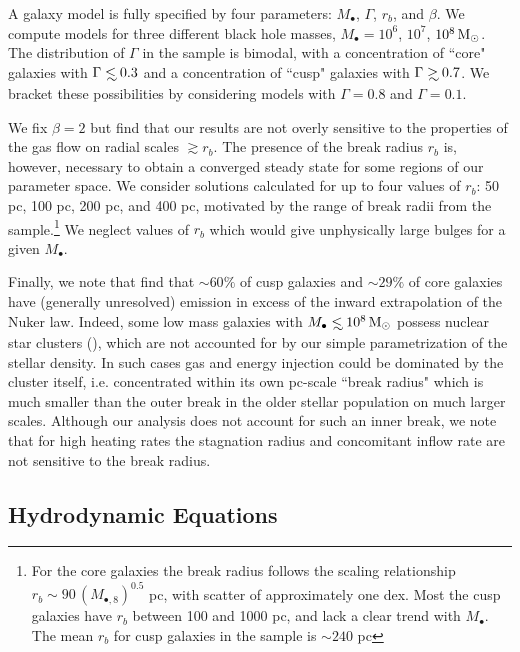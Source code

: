 \documentclass[usenatbib,fleqn]{mn2e}
\newcommand\lsim{\mathrel{\rlap{\lower4pt\hbox{\hskip1pt$\sim$}}
    \raise1pt\hbox{$<$}}}
\newcommand\gsim{\mathrel{\rlap{\lower4pt\hbox{\hskip1pt$\sim$}}
    \raise1pt\hbox{$>$}}}
\newcommand{\rb}{r_b}
\newcommand{\Mbh}[1][]{M_{\bullet#1}}
\newcommand{\Mbheight}{M_{\bullet,8}}
\begin{document}
A galaxy model is fully specified by four parameters: $\Mbh$,
$\Gamma$, $r_b$, and $\beta$.  We compute models for three different
black hole masses, $\Mbh = 10^6$, $10^7$, $10^8 \,{\rm M_\odot}$.  The
distribution of $\Gamma$ in the \citet{LauerFaber+:2007a} sample is
bimodal, with a concentration of ``core" galaxies with $\Gamma \lsim
0.3$ and a concentration of ``cusp" galaxies with $\Gamma \gsim 0.7$.
We bracket these possibilities by considering models with $\Gamma=0.8$
and $\Gamma=0.1$.  

We fix $\beta = 2$ but find that our results are not overly sensitive
to the properties of the gas flow on radial scales $\gtrsim r_b$.  The
presence of the break radius $r_{b}$ is, however, necessary to obtain
a converged steady state for some regions of our parameter space.  We
consider solutions calculated for up to four values of $\rb$: 50 pc,
100 pc, 200 pc, and 400 pc, motivated by the range of break radii from
the \citet{LauerFaber+:2007a} sample.\footnote{For the core galaxies
  the break radius follows the scaling relationship $\rb\sim 90 \,
  (\Mbheight)^{0.5}$ pc, with scatter of approximately one dex. Most
  the cusp galaxies have $\rb$ between 100 and 1000 pc, and lack a
  clear trend with $\Mbh$. The mean $r_b$ for cusp galaxies in the
  \citet{LauerFaber+:2007a} sample is $\sim 240$ pc} We neglect
values of $r_b$ which would give unphysically large bulges for a given
$\Mbh$.



Finally, we note that \citealt{LauerFaber+:2005a} find that $\sim
60\%$ of cusp galaxies and $\sim29\%$ of core galaxies have (generally
unresolved) emission in excess of the inward extrapolation of the
Nuker law.  Indeed, some low mass galaxies with $\Mbh\lsim 10^{8}
\Msun$ possess nuclear star clusters (\citealt{GrahamSpitler:2009a}),
which are not accounted for by our simple parametrization of the
stellar density.  In such cases gas and energy injection could be
dominated by the cluster itself, i.e. concentrated within its own
pc-scale ``break radius" which is much smaller than the outer break in
the older stellar population on much larger scales.  Although our
analysis does not account for such an inner break, we note that for
high heating rates the stagnation radius and concomitant inflow
rate are not sensitive to the break radius.


\subsection{Hydrodynamic Equations}
\label{sec:hydro}
\end{document}
